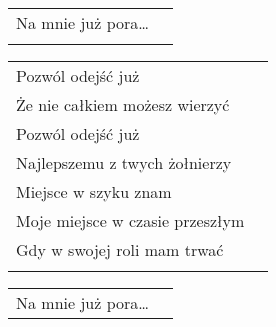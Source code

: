 \documentclass[a5paper]{article}
\begin{document}
\noindent
\begin{tabular}{@{}p{6.00cm}p{3cm}@{}}
Na mnie już pora… \\ \\
\end{tabular}

\noindent
\begin{tabular}{@{}p{6.00cm}p{3cm}@{}}
Pozwól odejść już \\
Że nie całkiem możesz wierzyć \\
Pozwól odejść już \\
Najlepszemu z twych żołnierzy \\
Miejsce w szyku znam \\
Moje miejsce w czasie przeszłym \\
Gdy w swojej roli mam trwać \\ \\
\end{tabular}

\noindent
\begin{tabular}{@{}p{6.00cm}p{3cm}@{}}
Na mnie już pora…
\end{tabular}
\end{document}
